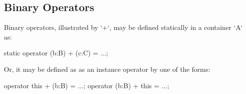 \subsection{Binary Operators}

Binary operators, illustrated by \xcd`+`, may be defined statically in a
container \xcd`A` as:
\begin{xten}
static operator (b:B) + (c:C) = ...;
\end{xten}
Or, it may be defined as  as an instance operator by one of the forms:
\begin{xten}
operator this + (b:B) = ...;
operator (b:B) + this = ...;
\end{xten}

